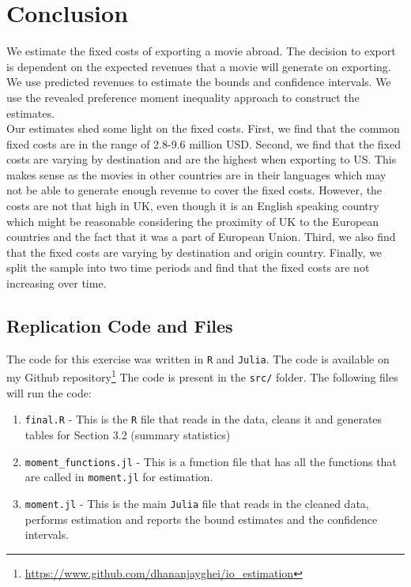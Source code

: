 \documentclass[11pt, letterpaper]{article} \usepackage{amsmath}
\begin{document}
\section{Conclusion}
We estimate the fixed costs of exporting a movie abroad. The decision
to export is dependent on the expected revenues that a movie will
generate on exporting. We use predicted revenues to estimate the
bounds and confidence intervals.  We use the revealed preference
moment inequality approach to construct the estimates.\\
Our estimates shed some light on the fixed costs. First, we find that
the common fixed costs are in the range of 2.8-9.6 million
USD. Second, we find that the fixed costs are varying by destination
and are the highest when exporting to US. This makes sense as the
movies in other countries are in their languages which may not be able
to generate enough revenue to cover the fixed costs. However, the
costs are not that high in UK, even though it is an English speaking
country which might be reasonable considering the proximity of UK to
the European countries and the fact that it was a part of European
Union. Third, we also find that the fixed costs are varying by
destination and origin country. Finally, we split the sample into two
time periods and find that the fixed costs are not increasing over
time.
\newpage

\newpage
\begin{appendices}
  \section{Replication Code and Files} \label{appendix:a} The code for
  this exercise was written in \texttt{R} and \texttt{Julia}. The code
  is available on my Github
  repository\footnote{\url{https://www.github.com/dhananjayghei/io_estimation}}
  The code is present in the \texttt{src/} folder. The following files
  will run the code:
\begin{enumerate}
\item \texttt{final.R} - This is the \texttt{R} file that reads in the
  data, cleans it and generates tables for Section 3.2 (summary
  statistics)
\item \texttt{moment\_functions.jl} - This is a function file that has
  all the functions that are called in \texttt{moment.jl} for
  estimation.
\item \texttt{moment.jl} - This is the main \texttt{Julia} file that
  reads in the cleaned data, performs estimation and reports the bound
  estimates and the confidence intervals.
\end{enumerate}
\end{appendices}
\end{document}

